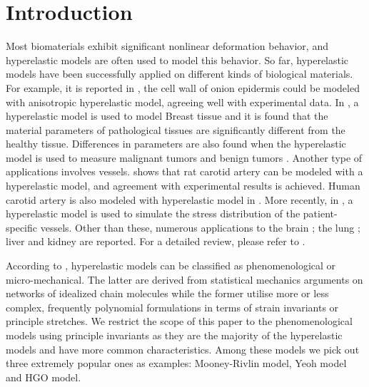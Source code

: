 \section{Introduction}
Most biomaterials exhibit significant nonlinear deformation behavior, and hyperelastic models are often used to model this behavior. So far, hyperelastic models have been successfully applied on different kinds of biological materials. For example, it is reported in \cite{Qian}, the cell wall of onion epidermis could be modeled with anisotropic hyperelastic model, agreeing well with experimental data. In  \cite{OHagen}, a hyperelastic model is used to model Breast tissue and it is found that the material parameters of pathological tissues are significantly different from the healthy tissue. Differences in parameters are also found when the hyperelastic model is used to measure malignant tumors and benign tumors \cite{Oberai}. Another type of applications involves vessels. \cite{Zidi} shows that rat carotid artery can be modeled with a hyperelastic model, and agreement with experimental results is achieved. Human carotid artery is also modeled with hyperelastic model in \cite{Zidi2}. More recently, in \cite{Bols}, a hyperelastic model is used to simulate the stress distribution of the patient-specific vessels.
Other than these, numerous applications to the brain \cite{Karimi, Samani, Gilchrist}; the lung \cite{Wall, Wall2}; liver and kidney \cite{Fu, Untaroiu, Willinger} are reported. For a detailed review, please refer to \cite{Kupriyanova}.

According to \cite{Steinmann}, hyperelastic models can be classified as phenomenological or micro-mechanical. The latter are derived from statistical mechanics arguments on networks of idealized chain molecules while the former utilise more or less complex, frequently polynomial formulations in terms of strain invariants or principle stretches. We restrict the scope of this paper to the phenomenological models using principle invariants as they are the majority of the hyperelastic models and have more common characteristics. Among these models we pick out three extremely popular ones as examples: Mooney-Rivlin model, Yeoh model and HGO model.


